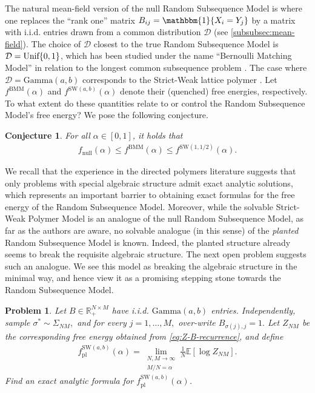 \documentclass[11pt]{amsart}
\numberwithin{equation}{section}
\numberwithin{equation}{section}
\newcommand{\1}{\mathbbm{1}}
\newcommand{\R}{\mathbb{R}}
\newcommand{\E}{\mathbb{E}}
\newcommand{\calD}{\mathcal{D}}
\newcommand{\Unif}{\textup{Unif}}
\newtheorem{conjecture}[theorem]{Conjecture}
\newtheorem{problem}[theorem]{Problem}
\theoremstyle{definition}
\begin{document}
The natural mean-field version of the null Random Subsequence Model is where one replaces the ``rank one'' matrix $B_{ij} = \1\{X_i = Y_j\}$ by a matrix with i.i.d. entries drawn from a common distribution $\calD$ (see \cref{subsubsec:mean-field}). The choice of $\calD$ closest to the true Random Subsequence Model is $\calD = \Unif\{0,1\}$, which has been studied under the name ``Bernoulli Matching Model'' in relation to the longest common subsequence problem \cite{boutetdemonvel1999extensive, majumdar2005exact}. The case where $\calD = \text{Gamma}(a,b)$ corresponds to the Strict-Weak lattice polymer \cite{corwin2015strict}. Let $f^{\mathrm{BMM}}(\alpha)$ and $f^{\mathrm{SW}(a,b)}(\alpha)$ denote their (quenched) free energies, respectively.
To what extent do these quantities relate to or control the Random Subsequence Model's free energy? We pose the following conjecture.
\begin{conjecture} \label{conj:MF-rank-one-comp}
    For all $\alpha \in [0,1]$, it holds that
    \begin{align*}
        f_{\mathrm{null}}(\alpha)\leq f^{\mathrm{BMM}}(\alpha) \leq f^{\mathrm{SW}(1,1/2)}(\alpha).
    \end{align*}
\end{conjecture}

We recall that the experience in the directed polymers literature suggests that only problems with special algebraic structure admit exact analytic solutions, which represents an important barrier to obtaining exact formulas for the free energy of the Random Subsequence Model. Moreover, while the solvable Strict-Weak Polymer Model is an analogue of the null Random Subsequence Model, as far as the authors are aware, no solvable analogue (in this sense) of the \emph{planted} Random Subsequence Model is known. Indeed, the planted structure already seems to break the requisite algebraic structure. The next open problem suggests such an analogue. We see this model as breaking the algebraic structure in the minimal way, and hence view it as a promising stepping stone towards the Random Subsequence Model.
\begin{problem}
    Let $B \in \R_{+}^{N\times M}$ have i.i.d. $\mathrm{Gamma}(a,b)$ entries. Independently, sample $\sigma^* \sim \Sigma_{NM},$ and for every $j=1,\dots,M,$ over-write $B_{\sigma(j),j} = 1.$ Let $Z_{NM}$ be the corresponding free energy obtained from \eqref{eq:Z-B-recurrence}, and define
    \begin{align*}
        f^{\mathrm{SW}(a,b)}_{\mathrm{pl}}(\alpha) = \lim_{\substack{N,M\to\infty \\ M/N = \alpha}} \frac{1}{N}\E\left[ \log Z_{NM} \right].
    \end{align*}
    Find an exact analytic formula for $f^{\mathrm{SW}(a,b)}_{\mathrm{pl}}(\alpha)$.
\end{problem}
\end{document}
